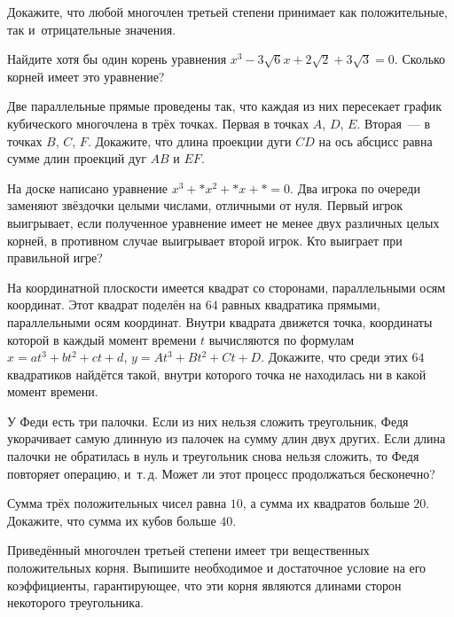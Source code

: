 



\begin{problems}

\item
Докажите, что любой многочлен третьей степени принимает как положительные, так
и~отрицательные значения.

\item
Найдите хотя бы один корень уравнения
$x^3 - 3 \sqrt{6} x + 2 \sqrt{2} + 3 \sqrt{3} = 0$.
Сколько корней имеет это уравнение?

\item
Две параллельные прямые проведены так, что каждая из них пересекает график
кубического многочлена в трёх точках.
Первая в точках $A$, $D$, $E$.
Вторая~--- в точках $B$, $C$, $F$.
Докажите, что длина проекции дуги $CD$ на ось абсцисс равна сумме длин проекций
дуг $AB$ и $EF$.

\item
На доске написано уравнение $x^3 + * x^2 + * x + * = 0$.
Два игрока по очереди заменяют звёздочки целыми числами, отличными от нуля.
Первый игрок выигрывает, если полученное уравнение имеет не менее двух
различных целых корней, в противном случае выигрывает второй игрок.
Кто выиграет при правильной игре?

\item
На координатной плоскости имеется квадрат со сторонами, параллельными осям
координат.
Этот квадрат поделён на $64$ равных квадратика прямыми, параллельными осям
координат.
Внутри квадрата движется точка, координаты которой в каждый момент времени $t$
вычисляются по формулам
$x = a t^3 + b t^2 + c t + d$,
$y = A t^3 + B t^2 + C t + D$.
Докажите, что среди этих $64$ квадратиков найдётся такой, внутри которого точка
не находилась ни в какой момент времени.

\item
У Феди есть три палочки.
Если из них нельзя сложить треугольник, Федя укорачивает самую длинную
из палочек на сумму длин двух других.
Если длина палочки не обратилась в нуль и треугольник снова нельзя сложить, то
Федя повторяет операцию, и~т.\,д.
Может ли этот процесс продолжаться бесконечно?

\item
Сумма трёх положительных чисел равна $10$, а сумма их квадратов больше $20$.
Докажите, что сумма их кубов больше $40$.

\item
Приведённый многочлен третьей степени имеет три вещественных положительных
корня.
Выпишите необходимое и достаточное условие на его коэффициенты, гарантирующее,
что эти корня являются длинами сторон некоторого треугольника.

\end{problems}

